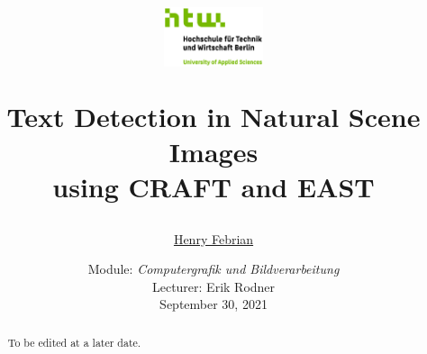 \documentclass[10pt, a4paper]{article}
\begin{document}
	\title{
	\begin{figure}[!ht]
			\includegraphics[width=0.26\textwidth]{img/htwlogo.jpg}
	\end{figure}
	\vspace{1cm}
	\Huge Text Detection in Natural Scene Images \\
	using CRAFT and EAST
	}
	
	\vspace{1cm}
	
	
	\author{\Large \href{mailto:s0566146@htw-berlin.de}{Henry Febrian}
	\vspace{1cm}}
	
	\date{
	\large Module: \textit{Computergrafik und Bildverarbeitung} \\
	\vspace{0.8cm}
	\large Lecturer: Erik Rodner \\
	\vspace{1cm}
	\large September 30, 2021
	}

	\maketitle
	\setlength{\parindent}{0pt}

\vspace{2cm}
\begin{abstract}
To be edited at a later date. 

\end{abstract}
	\newpage
	\tableofcontents
	\newpage
	
\end{document}
